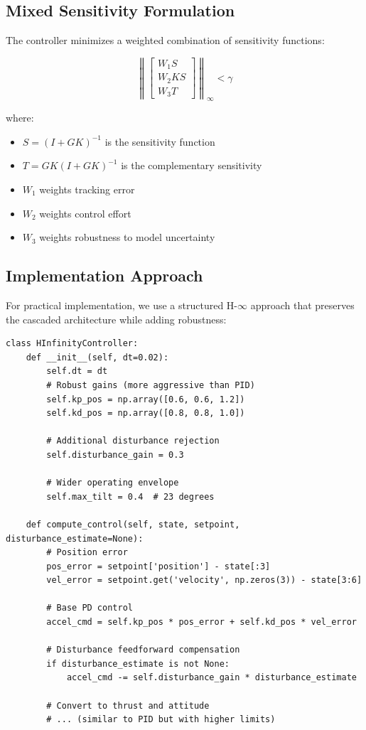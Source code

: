\subsection{Mixed Sensitivity Formulation}

The controller minimizes a weighted combination of sensitivity functions:

\begin{equation}
    \left\| \begin{bmatrix} W_1 S \\ W_2 KS \\ W_3 T \end{bmatrix} \right\|_\infty < \gamma
\end{equation}

where:
\begin{itemize}
    \item $S = (I + GK)^{-1}$ is the sensitivity function
    \item $T = GK(I + GK)^{-1}$ is the complementary sensitivity
    \item $W_1$ weights tracking error
    \item $W_2$ weights control effort
    \item $W_3$ weights robustness to model uncertainty
\end{itemize}

\subsection{Implementation Approach}

For practical implementation, we use a structured H-$\infty$ approach that preserves the cascaded architecture while adding robustness:

\begin{lstlisting}[caption={H-infinity controller implementation}]
class HInfinityController:
    def __init__(self, dt=0.02):
        self.dt = dt
        # Robust gains (more aggressive than PID)
        self.kp_pos = np.array([0.6, 0.6, 1.2])
        self.kd_pos = np.array([0.8, 0.8, 1.0])

        # Additional disturbance rejection
        self.disturbance_gain = 0.3

        # Wider operating envelope
        self.max_tilt = 0.4  # 23 degrees

    def compute_control(self, state, setpoint, disturbance_estimate=None):
        # Position error
        pos_error = setpoint['position'] - state[:3]
        vel_error = setpoint.get('velocity', np.zeros(3)) - state[3:6]

        # Base PD control
        accel_cmd = self.kp_pos * pos_error + self.kd_pos * vel_error

        # Disturbance feedforward compensation
        if disturbance_estimate is not None:
            accel_cmd -= self.disturbance_gain * disturbance_estimate

        # Convert to thrust and attitude
        # ... (similar to PID but with higher limits)
\end{lstlisting}

